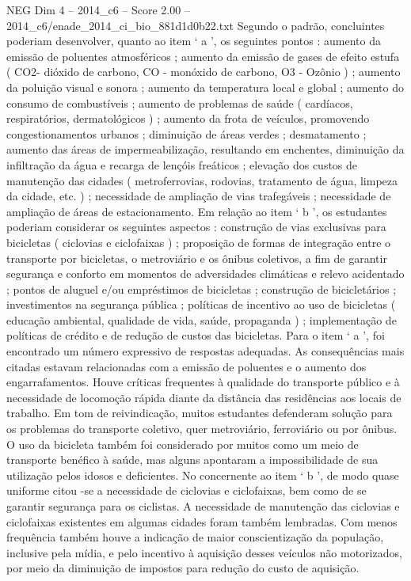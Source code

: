 \begin{textsample}{NEG Dim 4 – 2014\_c6 – Score 2.00 – 2014\_c6/enade\_2014\_ci\_bio\_881d1d0b22.txt}
Segundo o padrão, concluintes poderiam desenvolver, quanto ao item ‘ a ’, os seguintes pontos : aumento da emissão de poluentes atmosféricos ; aumento da emissão de gases de efeito estufa ( CO2- dióxido de carbono, CO - monóxido de carbono, O3 - Ozônio ) ; aumento da poluição visual e sonora ; aumento da temperatura local e global ; aumento do consumo de combustíveis ; aumento de problemas de saúde ( cardíacos, respiratórios, dermatológicos ) ; aumento da frota de veículos, promovendo congestionamentos urbanos ; diminuição de áreas verdes ; desmatamento ; aumento das áreas de impermeabilização, resultando em enchentes, diminuição da infiltração da água e recarga de lençóis freáticos ; elevação dos custos de manutenção das cidades ( metroferrovias, rodovias, tratamento de água, limpeza da cidade, etc. ) ; necessidade de ampliação de vias trafegáveis ; necessidade de ampliação de áreas de estacionamento.
Em relação ao item ‘ b ’, os estudantes poderiam considerar os seguintes aspectos : construção de vias exclusivas para bicicletas ( ciclovias e ciclofaixas ) ; proposição de formas de integração entre o transporte por bicicletas, o metroviário e os ônibus coletivos, a fim de garantir segurança e conforto em momentos de adversidades climáticas e relevo acidentado ; pontos de aluguel e/ou empréstimos de bicicletas ; construção de bicicletários ; investimentos na segurança pública ; políticas de incentivo ao uso de bicicletas ( educação ambiental, qualidade de vida, saúde, propaganda ) ; implementação de políticas de crédito e de redução de custos das bicicletas.
Para o item ‘ a ’, foi encontrado um número expressivo de respostas adequadas.
As consequências mais citadas estavam relacionadas com a emissão de poluentes e o aumento dos engarrafamentos.
Houve críticas frequentes à qualidade do transporte público e à necessidade de locomoção rápida diante da distância das residências aos locais de trabalho.
Em tom de reivindicação, muitos estudantes defenderam solução para os problemas do transporte coletivo, quer metroviário, ferroviário ou por ônibus.
O uso da bicicleta também foi considerado por muitos como um meio de transporte benéfico à saúde, mas alguns apontaram a impossibilidade de sua utilização pelos idosos e deficientes.
No concernente ao item ‘ b ’, de modo quase uniforme citou -se a necessidade de ciclovias e ciclofaixas, bem como de se garantir segurança para os ciclistas.
A necessidade de manutenção das ciclovias e ciclofaixas existentes em algumas cidades foram também lembradas.
Com menos frequência também houve a indicação de maior conscientização da população, inclusive pela mídia, e pelo incentivo à aquisição desses veículos não motorizados, por meio da diminuição de impostos para redução do custo de aquisição.

\end{textsample}
